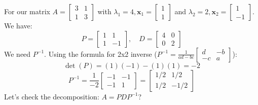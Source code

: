 \documentclass[11pt]{article}
\newcommand{\x}{\mathbf{x}}
\begin{document}
\begin{example}
For our matrix $A = \begin{bmatrix} 3 & 1 \\ 1 & 3 \end{bmatrix}$ with $\lambda_1=4, \x_1=\begin{bmatrix} 1 \\ 1 \end{bmatrix}$ and $\lambda_2=2, \x_2=\begin{bmatrix} 1 \\ -1 \end{bmatrix}$.
We have:
\[ P = \begin{bmatrix} 1 & 1 \\ 1 & -1 \end{bmatrix}, \quad D = \begin{bmatrix} 4 & 0 \\ 0 & 2 \end{bmatrix} \]
We need $P^{-1}$. Using the formula for 2x2 inverse ($P^{-1} = \frac{1}{ad-bc} \begin{bmatrix} d & -b \\ -c & a \end{bmatrix}$):
\[ \det(P) = (1)(-1) - (1)(1) = -2 \]
\[ P^{-1} = \frac{1}{-2} \begin{bmatrix} -1 & -1 \\ -1 & 1 \end{bmatrix} = \begin{bmatrix} 1/2 & 1/2 \\ 1/2 & -1/2 \end{bmatrix} \]
Let's check the decomposition: $A = PDP^{-1}$?

\end{example}
\end{document}
